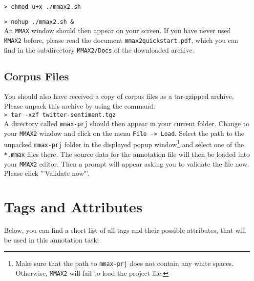\documentclass[11pt,a4paper]{article}
\begin{document}
\texttt{> chmod u+x ./mmax2.sh}

\texttt{> nohup ./mmax2.sh \&} \\\newline
       {\setlength{\parindent}{0pt}An \texttt{MMAX} window should then
         appear on your screen.  If you have never used \texttt{MMAX2}
         before, please read the document
         \texttt{mmax2quickstart.pdf}, which you can find in the
         subdirectory \texttt{MMAX2/Docs} of the downloaded archive.}

\subsection{Corpus Files}

You should also have received a copy of corpus files as a tar-gzipped
archive.  Please unpack this archive by using the command:\\\newline
\texttt{> tar -xzf twitter-sentiment.tgz}\\\newline
       {\setlength{\parindent}{0pt} A directory called
         \texttt{mmax-prj} should then appear in your current folder.
         Change to your \texttt{MMAX2} window and click on the menu
         \texttt{File -> Load}.  Select the path to the unpacked
         \texttt{mmax-prj} folder in the displayed popup
         window\footnote{Make sure that the path to \texttt{mmax-prj}
           does not contain any white spaces.  Otherwise,
           \texttt{MMAX2} will fail to load the project file.} and
         select one of the \texttt{*.mmax} files there. The source
         data for the annotation file will then be loaded into your
         \texttt{MMAX2} editor.} Then a prompt will appear asking you
		to validate the file now. Please click "'Validate now"'.


\section{Tags and Attributes}\label{sec:markables}
Below, you can find a short list of all tags and their possible
attributes, that will be used in this annotation task:
\end{document}
